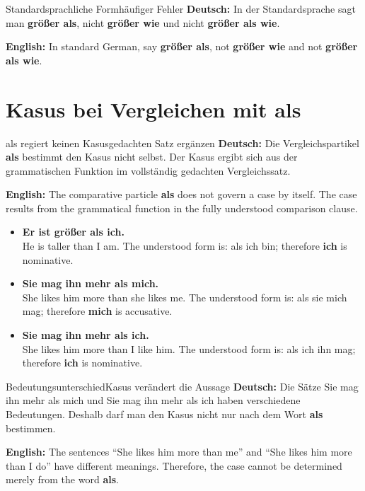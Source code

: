 \documentclass[a4paper,11pt]{article}
\newcommand{\GermanText}[1]{\textbf{Deutsch: }#1\par}
\newcommand{\EnglishText}[1]{{\small\color{SoftGray}\textbf{English: }#1\par}}
\newcommand{\ExampleItem}[2]{\item \textbf{#1}\\{\small\color{SoftGray}#2}}
\begin{document}
        \begin{grammarentry}{Standardsprachliche Form}{häufiger Fehler}
            \GermanText{In der Standardsprache sagt man \textbf{größer als}, nicht \textbf{größer wie} und nicht \textbf{größer als wie}.}
            \EnglishText{In standard German, say \textbf{größer als}, not \textbf{größer wie} and not \textbf{größer als wie}.}
        \end{grammarentry}

    \section{Kasus bei Vergleichen mit \glqq als\grqq}

        \begin{grammarentry}{als regiert keinen Kasus}{gedachten Satz ergänzen}
            \GermanText{Die Vergleichspartikel \textbf{als} bestimmt den Kasus nicht selbst. Der Kasus ergibt sich aus der grammatischen Funktion im vollständig gedachten Vergleichssatz.}
            \EnglishText{The comparative particle \textbf{als} does not govern a case by itself. The case results from the grammatical function in the fully understood comparison clause.}
        \end{grammarentry}

        \begin{exbox}
            \begin{itemize}
                \ExampleItem{Er ist größer als ich.}{He is taller than I am. The understood form is: \glqq als ich bin\grqq; therefore \textbf{ich} is nominative.}
                \ExampleItem{Sie mag ihn mehr als mich.}{She likes him more than she likes me. The understood form is: \glqq als sie mich mag\grqq; therefore \textbf{mich} is accusative.}
                \ExampleItem{Sie mag ihn mehr als ich.}{She likes him more than I like him. The understood form is: \glqq als ich ihn mag\grqq; therefore \textbf{ich} is nominative.}
            \end{itemize}
        \end{exbox}

        \begin{grammarentry}{Bedeutungsunterschied}{Kasus verändert die Aussage}
            \GermanText{Die Sätze \glqq Sie mag ihn mehr als mich\grqq{} und \glqq Sie mag ihn mehr als ich\grqq{} haben verschiedene Bedeutungen. Deshalb darf man den Kasus nicht nur nach dem Wort \textbf{als} bestimmen.}
            \EnglishText{The sentences ``She likes him more than me'' and ``She likes him more than I do'' have different meanings. Therefore, the case cannot be determined merely from the word \textbf{als}.}
        \end{grammarentry}
\end{document}
